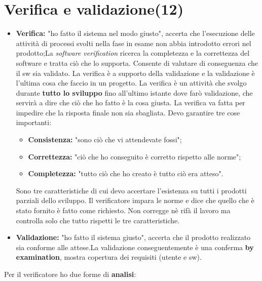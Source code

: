 



\section{Verifica e validazione(12)}


\begin{itemize}

	\item \textbf{Verifica:} "ho fatto il sistema nel modo giusto", accerta che l'esecuzione delle attività di processi svolti nella fase in esame non abbia introdotto errori nel prodotto;La \textit{software verification} ricerca la completezza e la correttezza del software e tratta ciò che lo supporta. Consente di valutare di conseguenza che il sw sia validato. La verifica è a supporto della validazione e la validazione è l'ultima cosa che faccio in un progetto. La verifica è un attività che svolgo durante \textbf{tutto lo sviluppo} fino all'ultimo istante dove farò validazione, che servirà a dire che ciò che ho fatto è la cosa giusta. La verifica va fatta per impedire che la risposta finale non sia sbagliata. Devo garantire tre cose importanti:

\begin{itemize}

	\item \textbf{Consistenza:} "sono ciò che vi attendevate fossi";
	\item \textbf{Correttezza:} "ciò che ho conseguito è corretto rispetto alle norme";
	\item \textbf{Completezza:} "tutto ciò che ho creato è tutto ciò era atteso".

\end{itemize}

Sono tre caratteristiche di cui devo accertare l'esistenza su tutti i prodotti parziali dello sviluppo. Il verificatore impara le norme e dice che quello che è stato fornito è fatto come richiesto. Non corregge nè rifà il lavoro ma controlla solo che tutto rispetti le tre caratteristiche. 
	\item \textbf{Validazione:} "ho fatto il sistema giusto", accerta che il prodotto realizzato sia conforme alle attese.La validazione conseguentemente è una conferma \textbf{by examination}, mostra copertura dei requisiti (utente e sw).

\end{itemize}

Per il verificatore ho due forme di \textbf{analisi}:

